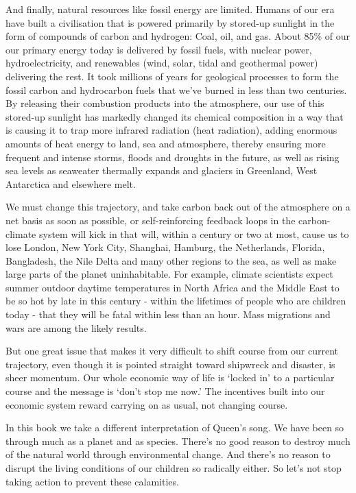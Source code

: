 \documentclass[]{tufte-handout}
\begin{document}
And finally, natural resources like fossil energy are limited. Humans of
our era have built a civilisation that is powered primarily by stored-up
sunlight in the form of compounds of carbon and hydrogen: Coal, oil, and
gas. About 85\% of our our primary energy today is delivered by fossil
fuels, with nuclear power, hydroelectricity, and renewables (wind,
solar, tidal and geothermal power) delivering the rest. It took millions
of years for geological processes to form the fossil carbon and
hydrocarbon fuels that we've burned in less than two centuries. By
releasing their combustion products into the atmosphere, our use of this
stored-up sunlight has markedly changed its chemical composition in a
way that is causing it to trap more infrared radiation (heat radiation),
adding enormous amounts of heat energy to land, sea and atmosphere,
thereby ensuring more frequent and intense storms, floods and droughts
in the future, as well as rising sea levels as seaweater thermally
expands and glaciers in Greenland, West Antarctica and elsewhere melt.

We must change this trajectory, and take carbon back out of the
atmosphere on a net basis as soon as possible, or self-reinforcing
feedback loops in the carbon-climate system will kick in that will,
within a century or two at most, cause us to lose London, New York City,
Shanghai, Hamburg, the Netherlands, Florida, Bangladesh, the Nile Delta
and many other regions to the sea, as well as make large parts of the
planet uninhabitable. For example, climate scientists expect summer
outdoor daytime temperatures in North Africa and the Middle East to be
so hot by late in this century - within the lifetimes of people who are
children today - that they will be fatal within less than an hour. Mass
migrations and wars are among the likely results.

But one great issue that makes it very difficult to shift course from
our current trajectory, even though it is pointed straight toward
shipwreck and disaster, is sheer momentum. Our whole economic way of
life is `locked in' to a particular course and the message is `don't
stop me now.' The incentives built into our economic system reward
carrying on as usual, not changing course.

In this book we take a different interpretation of Queen's song. We have
been so through much as a planet and as species. There's no good reason
to destroy much of the natural world through environmental change. And
there's no reason to disrupt the living conditions of our children so
radically either. So let's not stop taking action to prevent these
calamities.
\end{document}

